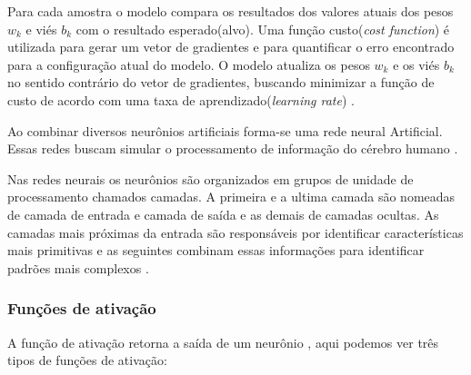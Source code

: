\documentclass[
	12pt,				%
	openright,			%
	twoside,			%
	a4paper,			%
	english,			%
	french,				%
	spanish,			%
	brazil				%
	]{abntex2}
\begin{document}
Para cada amostra o modelo compara os resultados dos valores atuais dos pesos $w_k$ e viés $b_k$ com o resultado esperado(alvo). Uma função custo(\textit{cost function}) é utilizada para gerar um vetor de gradientes e para quantificar o erro encontrado para a configuração atual do modelo. O modelo atualiza os pesos $w_k$ e os viés $b_k$ no sentido contrário do vetor de gradientes, buscando minimizar a função de custo de acordo com uma taxa de aprendizado(\textit{learning rate}) \cite{marti2017aprendizado}.

Ao combinar diversos neurônios artificiais forma-se uma rede neural Artificial. Essas redes buscam simular o processamento de informação do cérebro humano \cite{ferneda2006redes}.

Nas redes neurais os neurônios são organizados em grupos de unidade de processamento chamados camadas. A primeira e a ultima camada são nomeadas de camada de entrada e camada de saída e as demais de camadas ocultas. As camadas mais próximas da entrada são responsáveis por identificar características mais primitivas e as seguintes combinam essas informações para identificar padrões mais complexos \cite{marti2017aprendizado}.

\subsubsection{Funções de ativação}

A função de ativação retorna a saída de um neurônio \cite{haykin1999neural}, aqui podemos ver três tipos de funções de ativação:
\end{document}
